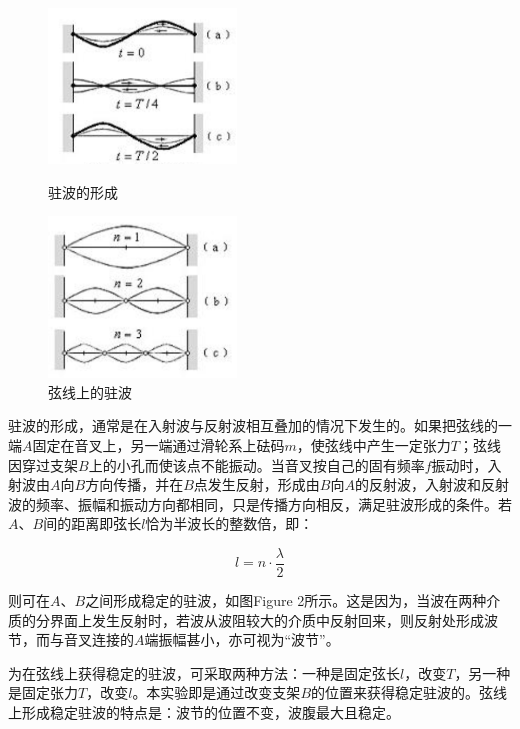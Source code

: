 \documentclass{article}
\begin{document}
\begin{figure}[ht]
    \centering
    \begin{minipage}{0.45\textwidth} %
        \centering
        \includegraphics[width=5cm]{1.png} %
        \caption{驻波的形成}
    \end{minipage}\hfill
    \begin{minipage}{0.45\textwidth}
        \centering
        \includegraphics[width=5cm]{2.png} %
        \caption{弦线上的驻波}
    \end{minipage}
\end{figure}

驻波的形成，通常是在入射波与反射波相互叠加的情况下发生的。如果把弦线的一端$A$固定在音叉上，另一端通过滑轮系上砝码$m$，使弦线中产生一定张力$T$；弦线因穿过支架$B$上的小孔而使该点不能振动。当音叉按自己的固有频率$f$振动时，入射波由$A$向$B$方向传播，并在$B$点发生反射，形成由$B$向$A$的反射波，入射波和反射波的频率、振幅和振动方向都相同，只是传播方向相反，满足驻波形成的条件。若$A$、$B$间的距离即弦长$l$恰为半波长的整数倍，即：

\begin{equation}
    l = n\cdot\frac{\lambda}{2}
\end{equation}

则可在\(A\)、\(B\)之间形成稳定的驻波，如图Figure 2所示。这是因为，当波在两种介质的分界面上发生反射时，若波从波阻较大的介质中反射回来，则反射处形成波节，而与音叉连接的\(A\)端振幅甚小，亦可视为“波节”。

为在弦线上获得稳定的驻波，可采取两种方法：一种是固定弦长\(l\)，改变\(T\)，另一种是固定张力\(T\)，改变\(l\)。本实验即是通过改变支架\(B\)的位置来获得稳定驻波的。弦线上形成稳定驻波的特点是：波节的位置不变，波腹最大且稳定。
\end{document}
